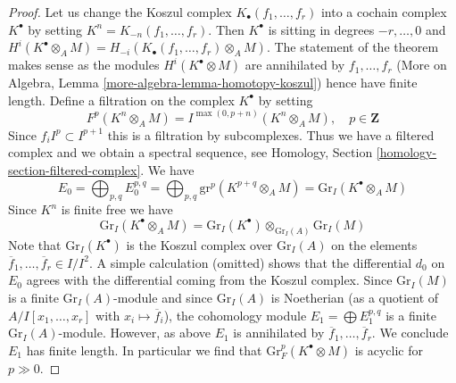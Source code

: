 \begin{proof}

Let us change the Koszul complex $K_\bullet(f_1, \ldots, f_r)$ into a cochain
complex $K^\bullet$ by setting $K^n = K_{-n}(f_1, \ldots, f_r)$.
Then $K^\bullet$ is sitting in degrees $-r, \ldots, 0$ and
$H^i(K^\bullet \otimes_A M) = H_{-i}(K_\bullet(f_1, \ldots, f_r) \otimes_A M)$.
The statement of the theorem makes sense as the modules
$H^i(K^\bullet \otimes M)$ are annihilated by $f_1, \ldots, f_r$
(More on Algebra, Lemma \ref{more-algebra-lemma-homotopy-koszul})
hence have finite length.
Define a filtration on the complex $K^\bullet$ by setting
$$
F^p(K^n \otimes_A M) =
I^{\max(0, p + n)}(K^n \otimes_A M),\quad p \in \mathbf{Z}
$$
Since $f_i I^p \subset I^{p + 1}$ this is a filtration by subcomplexes.
Thus we have a filtered complex and we obtain a spectral sequence, see
Homology, Section \ref{homology-section-filtered-complex}.
We have
$$
E_0 = \bigoplus\nolimits_{p, q} E_0^{p, q} =
\bigoplus\nolimits_{p, q} \text{gr}^p(K^{p + q} \otimes_A M) =
\text{Gr}_I(K^\bullet \otimes_A M)
$$
Since $K^n$ is finite free we have
$$
\text{Gr}_I(K^\bullet \otimes_A M) =
\text{Gr}_I(K^\bullet) \otimes_{\text{Gr}_I(A)} \text{Gr}_I(M)
$$
Note that $\text{Gr}_I(K^\bullet)$ is the Koszul
complex over $\text{Gr}_I(A)$ on the elements
$\overline{f}_1, \ldots, \overline{f}_r \in I/I^2$.
A simple calculation (omitted)
shows that the differential $d_0$ on $E_0$
agrees with the differential coming from the Koszul complex.
Since $\text{Gr}_I(M)$ is a finite $\text{Gr}_I(A)$-module
and since $\text{Gr}_I(A)$ is Noetherian (as a quotient
of $A/I[x_1, \ldots, x_r]$ with $x_i \mapsto \overline{f}_i$), the
cohomology module $E_1 = \bigoplus E_1^{p, q}$
is a finite $\text{Gr}_I(A)$-module. However, as above
$E_1$ is annihilated by $\overline{f}_1, \ldots, \overline{f}_r$.
We conclude $E_1$ has finite length.
In particular we find that $\text{Gr}^p_F(K^\bullet \otimes M)$ is
acyclic for $p \gg 0$.


\end{proof}
